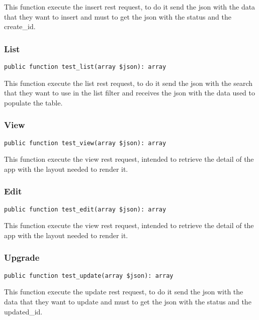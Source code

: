 \documentclass[a4paper]{article}
\begin{document}
This function execute the insert rest request, to do it send the json with
the data that they want to insert and must to get the json with the status
and the create\_id.

\hypertarget{toc64}{}
\subsubsection{List}

\begin{lstlisting}
public function test_list(array $json): array
\end{lstlisting}

This function execute the list rest request, to do it send the json with
the search that they want to use in the list filter and receives the json
with the data used to populate the table.

\hypertarget{toc65}{}
\subsubsection{View}

\begin{lstlisting}
public function test_view(array $json): array
\end{lstlisting}

This function execute the view rest request, intended to retrieve the detail
of the app with the layout needed to render it.

\hypertarget{toc66}{}
\subsubsection{Edit}

\begin{lstlisting}
public function test_edit(array $json): array
\end{lstlisting}

This function execute the view rest request, intended to retrieve the detail
of the app with the layout needed to render it.

\hypertarget{toc67}{}
\subsubsection{Upgrade}

\begin{lstlisting}
public function test_update(array $json): array
\end{lstlisting}

This function execute the update rest request, to do it send the json with
the data that they want to update and must to get the json with the status
and the updated\_id.
\end{document}
